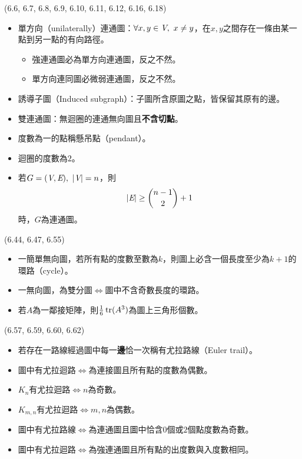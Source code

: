 \item \begin{theorem}{(6.6, 6.7, 6.8, 6.9, 6.10, 6.11, 6.12, 6.16, 6.18)} \quad\quad
    \begin{itemize}
        \item 單方向（unilaterally）連通圖：$\forall x, y \in \textit{V}, \ x \neq y$，在$x, y$之間存在一條由某一點到另一點的有向路徑。
        \begin{itemize}
            \item 強連通圖必為單方向連通圖，反之不然。
            \item 單方向連同圖必微弱連通圖，反之不然。
        \end{itemize}
        \item 誘導子圖（Induced subgraph）：子圖所含原圖之點，皆保留其原有的邊。
        \item 雙連通圖：無迴圈的連通無向圖且\textbf{不含切點}。
        \item 度數為一的點稱懸吊點（pendant）。
        \item 迴圈的度數為$2$。
        \item 若$G = (\textit{V}, \textit{E}), \ |\textit{V}| = n$，則\begin{equation}
            |\textit{E}| \ge \binom{n - 1}{2} + 1
        \end{equation}
        時，$G$為連通圖。
    \end{itemize}
\end{theorem}

\item \begin{theorem}{(6.44, 6.47, 6.55)} \quad\quad
    \begin{itemize}
        \item 一簡單無向圖，若所有點的度數至數為$k$，則圖上必含一個長度至少為$k + 1$的環路（cycle）。
        \item 一無向圖，為雙分圖$\iff$圖中不含奇數長度的環路。
        \item 若$A$為一鄰接矩陣，則$\frac{1}{6}\operatorname{tr}(A^3)$為圖上三角形個數。
    \end{itemize}
\end{theorem}

\item \begin{theorem}{(6.57, 6.59, 6.60, 6.62)} \quad\quad
    \begin{itemize}
        \item 若存在一路線經過圖中每一\textbf{邊}恰一次稱有尤拉路線（Euler trail）。
        \item 圖中有尤拉迴路$\iff$為連接圖且所有點的度數為偶數。
        \item $K_n$有尤拉迴路$\iff$$n$為奇數。
        \item $K_{m, n}$有尤拉迴路$\iff$$m, n$為偶數。
        \item 圖中有尤拉路線$\iff$為連通圖且圖中恰含$0$個或$2$個點度數為奇數。
        \item 圖中有尤拉迴路$\iff$為強連通圖且所有點的出度數與入度數相同。
    \end{itemize}
\end{theorem}

